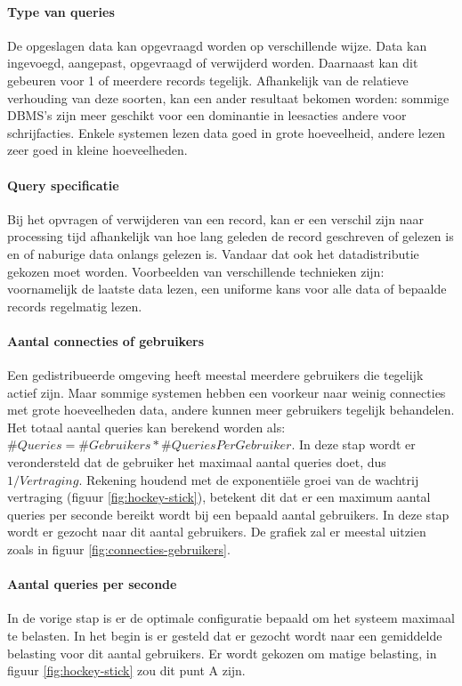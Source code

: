 \paragraph{Type van queries} De opgeslagen data kan opgevraagd worden op verschillende wijze. Data kan ingevoegd, aangepast, opgevraagd of verwijderd worden. Daarnaast kan dit gebeuren voor 1 of meerdere records tegelijk. Afhankelijk van de relatieve verhouding van deze soorten, kan een ander resultaat bekomen worden: sommige DBMS's zijn meer geschikt voor een dominantie in leesacties andere voor schrijfacties. Enkele systemen lezen data goed in grote hoeveelheid, andere lezen zeer goed in kleine hoeveelheden. 

\paragraph{Query specificatie} Bij het opvragen of verwijderen van een record, kan er een verschil zijn naar processing tijd afhankelijk van hoe lang geleden de record geschreven of gelezen is en of naburige data onlangs gelezen is. Vandaar dat ook het datadistributie gekozen moet worden. Voorbeelden van verschillende technieken zijn: voornamelijk de laatste data lezen, een uniforme kans voor alle data of bepaalde records regelmatig lezen.

\paragraph{Aantal connecties of gebruikers} Een gedistribueerde omgeving heeft meestal meerdere gebruikers die tegelijk actief zijn. Maar sommige systemen hebben een voorkeur naar weinig connecties met grote hoeveelheden data, andere kunnen meer gebruikers tegelijk behandelen. Het totaal aantal queries kan berekend worden als: $\#Queries = \#Gebruikers * \#QueriesPerGebruiker$. In deze stap wordt er verondersteld dat de gebruiker het maximaal aantal queries doet, dus $1/Vertraging$. Rekening houdend met de exponentiële groei van de wachtrij vertraging (figuur \ref{fig:hockey-stick}), betekent dit dat er een maximum aantal queries per seconde bereikt wordt bij een bepaald aantal gebruikers. In deze stap wordt er gezocht naar dit aantal gebruikers. De grafiek zal er meestal uitzien zoals in figuur \ref{fig:connecties-gebruikers}. 

\paragraph{Aantal queries per seconde} In de vorige stap is er de optimale configuratie bepaald om het systeem maximaal te belasten. In het begin is er gesteld dat er gezocht wordt naar een gemiddelde belasting voor dit aantal gebruikers. Er wordt gekozen om matige belasting, in figuur \ref{fig:hockey-stick} zou dit punt A zijn. 

